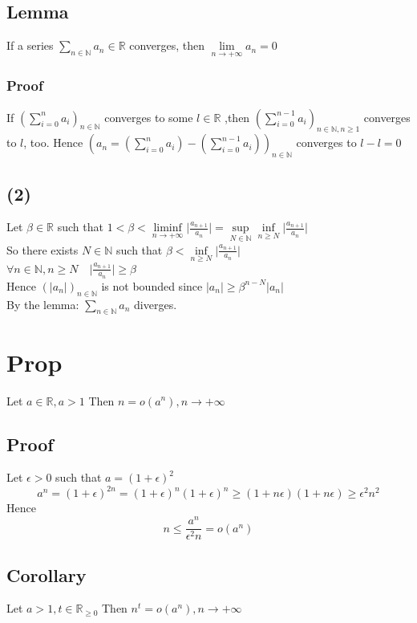 \documentclass{book}
\begin{document}
\subsection{Lemma}
If a series $\sum\limits_{n\in \mathbb{N} }a_n \in\mathbb{R} $ converges, then $\lim\limits_{n\rightarrow+\infty}a_n=0$
\subsubsection{Proof}
If $(\sum\limits_{i=0}^na_i)_{n\in \mathbb{N} }$ converges to some $l\in\mathbb{R} $ ,then $(\sum\limits_{i=0}^{n-1}a_i)_{n\in \mathbb{N},n\geq 1 }$ converges to $l$, too. Hence $\left(a_n=\left(\sum\limits_{i=0}^na_i\right)-\left(\sum\limits_{i=0}^{n-1}a_i\right)\right)_{n\in\mathbb{N} }$ converges to $l-l=0$
\subsection{(2)}Let $\beta\in \mathbb{R} $ such that $1<\beta<\liminf\limits_{n\rightarrow+\infty}\lvert\frac{a_{n+1}}{a_n}\rvert=\sup\limits_{N\in\mathbb{N} }\inf\limits_{n\geq N}\lvert\frac{a_{n+1}}{a_n}\rvert$\\
So there exists $N\in\mathbb{N} $ such that $\beta< \inf\limits_{n\geq N}\lvert \frac{a_{n+1}}{a_n}\rvert$\\
$\forall n\in \mathbb{N} ,n\geq N\quad \lvert \frac{a_{n+1}}{a_n}\rvert\geq\beta$\\
Hence $(\lvert a_n\rvert)_{n\in \mathbb{N} }$ is not bounded since $\lvert a_n\rvert\geq\beta^{n-N}\lvert a_n\rvert $\\
By the lemma: $\sum\limits_{n\in\mathbb{N} }a_n$ diverges.

\section{Prop}
Let $a\in \mathbb{R} ,a>1$ Then $n=o(a^n),n\rightarrow +\infty$
\subsection{Proof}
Let $\epsilon>0$ such that $a=(1+\epsilon)^2$
$$a^n=(1+\epsilon)^{2n}=(1+\epsilon)^n(1+\epsilon)^n\geq(1+n\epsilon)(1+n\epsilon)\geq\epsilon^2n^2$$
Hence
$$n\leq\frac{a^n}{\epsilon^2n}=o(a^n)$$
\subsection{Corollary}
Let $a>1,t\in \mathbb{R} _{\geq 0}$ Then $n^t=o(a^n),n\rightarrow+\infty$
\end{document}
